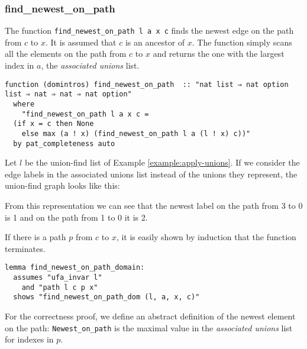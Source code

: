\subsubsection{find\_newest\_on\_path}

The function \lstinline{find_newest_on_path l a x c} finds the newest edge on the path from $c$ to $x$. It is assumed that $c$ is an ancestor of $x$. The function simply scans all the elements on the path from $c$ to $x$ and returns the one with the largest index in $a$, the \emph{associated unions} list.

\begin{lstlisting}
function (domintros) find_newest_on_path  :: "nat list ⇒ nat option list ⇒ nat ⇒ nat ⇒ nat option"
  where
    "find_newest_on_path l a x c =
  (if x = c then None
    else max (a ! x) (find_newest_on_path l a (l ! x) c))"
  by pat_completeness auto
\end{lstlisting}

\begin{exmp}
Let $l$ be the union-find list of Example \ref{example:apply-unions}. If we consider the edge labels in the associated unions list instead of the unions they represent, the union-find graph looks like this:

\begin{center}
\end{center}

From this representation we can see that the newest label on the path from 3 to 0 is 1 and on the path from 1 to 0 it is 2.
\end{exmp}

If there is a path $p$ from $c$ to $x$, it is easily shown by induction that the function terminates.

\begin{lstlisting}
lemma find_newest_on_path_domain:
  assumes "ufa_invar l"
    and "path l c p x"
  shows "find_newest_on_path_dom (l, a, x, c)"
\end{lstlisting}

For the correctness proof, we define an abstract definition of the newest element on the path: \lstinline{Newest_on_path} is the maximal value in the \emph{associated unions} list for indexes in $p$.

